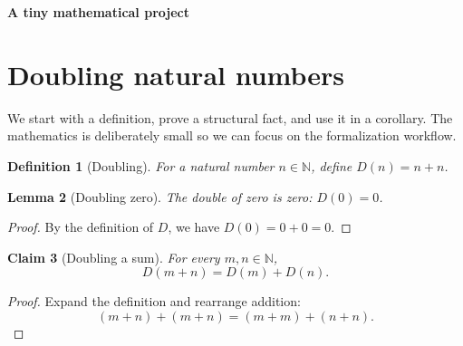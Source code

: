\documentclass[11pt]{article}
\newtheorem{definition}{Definition}[section]
\newtheorem{lemma}[definition]{Lemma}
\newtheorem{claim}[definition]{Claim}
\newcommand{\demotitle}[2]{%
  \noindent{\small\color{leagreen}\sffamily\bfseries #1}\par
  \vspace{0.3em}
  {\LARGE\sffamily\bfseries #2}\par
  \vspace{0.8em}}
\begin{document}

\demotitle{LEA DEMO / 01}{A tiny mathematical project}
\section{Doubling natural numbers}

We start with a definition, prove a structural fact, and use it in a
corollary. The mathematics is deliberately small so we can focus on the
formalization workflow.

\begin{definition}[Doubling]\label{def:demo-double}
For a natural number $n\in\mathbb{N}$, define $D(n)=n+n$.
\end{definition}

\begin{lemma}[Doubling zero]\label{lem:demo-double-zero}
The double of zero is zero: $D(0)=0$.
\end{lemma}
\begin{proof}
By the definition of $D$, we have $D(0)=0+0=0$.
\end{proof}

\begin{claim}[Doubling a sum]\label{clm:demo-double-add}
For every $m,n\in\mathbb{N}$,
\[
  D(m+n)=D(m)+D(n).
\]
\end{claim}
\begin{proof}
Expand the definition and rearrange addition:
\[
  (m+n)+(m+n)=(m+m)+(n+n).
\]
\end{proof}
\end{document}
